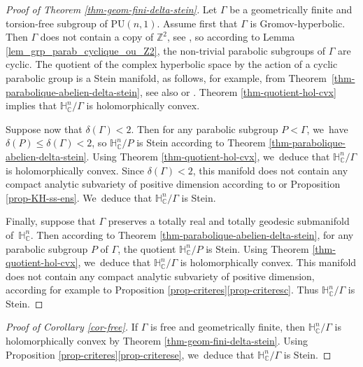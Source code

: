 \documentclass[JEP,XML,SOM,Unicode,NoEqCountersInSection,published]{cedram}
\theoremstyle{definition}
\newcommand{\C}{\mathbb{C}}
\newcommand{\Z}{\mathbb{Z}}
\newcommand{\HNC}{\mathbb{H}^{n}_{\C}}
\newcommand{\PU}{\mathrm{PU}}
\def\C{\mathbb{C}}
\newcommand{\HNC}{\mathbb{H}^{n}_{\C}}
\newcommand{\PU}{\mathrm{PU}}
\begin{document}
\begin{proof}[Proof of Theorem \ref{thm-geom-fini-delta-stein}]
Let $\Gamma$ be a geometrically finite and torsion-free subgroup of $\PU(n,1)$. Assume first that $\Gamma$ is Gromov-hyperbolic. Then $\Gamma$ does not contain a copy of $\Z^{2}$, see \cite[Cor.\,III.$\Gamma$.3.10]{bridsonMetricSpacesNonpositive1999}, so according to Lemma \ref{lem_grp_parab_cyclique_ou_Z2}, the non-trivial parabolic subgroups of $\Gamma$ are cyclic. The quotient of the complex hyperbolic space by the action of a cyclic parabolic group is a Stein manifold, as follows, for example, from Theorem~\ref{thm-parabolique-abelien-delta-stein}, see also \cite{defabritiisQuotientsUnitBall2001manuel} or \cite{miebachQuotientsBoundedHomogeneous2010}. Theorem \ref{thm-quotient-hol-cvx} implies that $\HNC/\Gamma$ is holomorphically convex.

Suppose now that $\delta(\Gamma)<2$. Then for any parabolic subgroup $P<\Gamma$, we~have $\delta(P)\le \delta(\Gamma)<2$, so $\HNC/P$ is Stein according to Theorem \ref{thm-parabolique-abelien-delta-stein}. Using Theorem \ref{thm-quotient-hol-cvx}, we~deduce that $\HNC/\Gamma$ is holomorphically convex. Since $\delta(\Gamma)<2$, this manifold does not contain any compact analytic subvariety of positive dimension according to \cite[Th.\,15]{deyNoteComplexhyperbolicKleinian2020} or Proposition \ref{prop-KH-ss-ens}. We~deduce that $\HNC/\Gamma$ is Stein.

Finally, suppose that $\Gamma$ preserves a totally real and totally geodesic submanifold of~$\HNC$. Then according to Theorem \ref{thm-parabolique-abelien-delta-stein}, for any parabolic subgroup $P$ of $\Gamma$, the quotient $\HNC/P$ is Stein. Using Theorem \ref{thm-quotient-hol-cvx}, we~deduce that $\HNC/\Gamma$ is holomorphically convex. This manifold does not contain any compact analytic subvariety of positive dimension, according for example to Proposition \ref{prop-criteres}\eqref{prop-criteresc}. Thus $\HNC/\Gamma$ is Stein.
\end{proof}

\begin{proof}[Proof of Corollary \ref{cor-free}]
If $\Gamma$ is free and geometrically finite, then $\HNC/\Gamma$ is holomorphically convex by Theorem \ref{thm-geom-fini-delta-stein}. Using Proposition \ref{prop-criteres}\eqref{prop-criterese}, we~deduce that $\HNC/\Gamma$ is Stein.
\end{proof}
\end{document}
